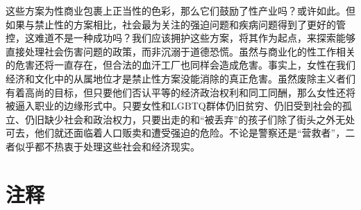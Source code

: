 \documentclass[fontset=fandol, a4paper, 12pt, openright]{ctexbook}
\begin{document}
这些方案为性商业包裹上正当性的色彩，那么它们鼓励了性产业吗？或许如此。但如果与禁止性的方案相比，社会最为关注的强迫问题和疾病问题得到了更好的管控，这难道不是一种成功吗？我们应该拥护这些方案，将其作为起点，来探索能够直接处理社会伤害问题的政策，而非沉溺于道德恐慌。虽然与商业化的性工作相关的危害还将一直存在，但合法的血汗工厂也同样会造成危害。事实上，女性在我们经济和文化中的从属地位才是禁止性方案没能消除的真正危害。虽然废除主义者们有着高尚的目标，但只要他们否认平等的经济政治权利和同工同酬，那么女性还将被逼入职业的边缘形式中。只要女性和LGBTQ群体仍旧贫穷、仍旧受到社会的孤立、仍旧缺少社会和政治权力，只要出走的和“被丢弃”的孩子们除了街头之外无处可去，他们就还面临着人口贩卖和遭受强迫的危险。不论是警察还是“营救者”，二者似乎都不热衷于处理这些社会和经济现实。

\section*{注释}
\end{document}
